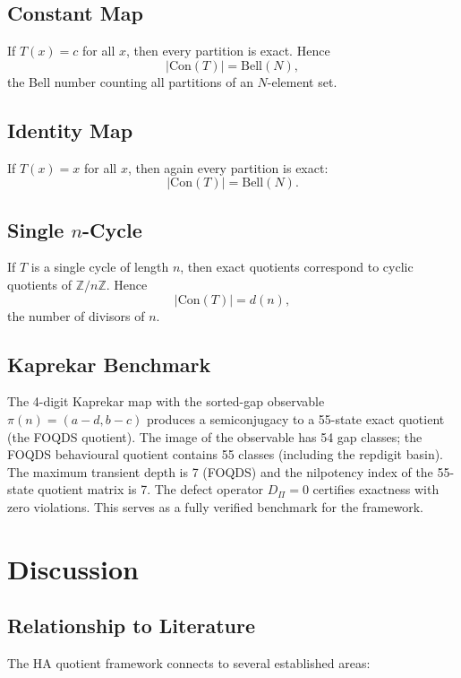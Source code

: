 \documentclass[11pt, a4paper]{article}
\theoremstyle{definition}
\theoremstyle{remark}
\begin{document}
\subsection{Constant Map}

If \(T(x) = c\) for all \(x\), then every partition is exact. Hence
\[
|\mathrm{Con}(T)| = \mathrm{Bell}(N),
\]
the Bell number counting all partitions of an \(N\)-element set.

\subsection{Identity Map}

If \(T(x) = x\) for all \(x\), then again every partition is exact:
\[
|\mathrm{Con}(T)| = \mathrm{Bell}(N).
\]

\subsection{Single \(n\)-Cycle}

If \(T\) is a single cycle of length \(n\), then exact quotients correspond to cyclic quotients of \(\mathbb{Z}/n\mathbb{Z}\). Hence
\[
|\mathrm{Con}(T)| = d(n),
\]
the number of divisors of \(n\).

\subsection{Kaprekar Benchmark}

The 4-digit Kaprekar map with the sorted-gap observable \(\pi(n) = (a-d, b-c)\) produces a semiconjugacy to a 55-state exact quotient (the FOQDS quotient). The image of the observable has 54 gap classes; the FOQDS behavioural quotient contains 55 classes (including the repdigit basin). The maximum transient depth is 7 (FOQDS) and the nilpotency index of the 55-state quotient matrix is 7. The defect operator \(D_\Pi = 0\) certifies exactness with zero violations. This serves as a fully verified benchmark for the framework.

\section{Discussion}

\subsection{Relationship to Literature}

The HA quotient framework connects to several established areas:
\end{document}
